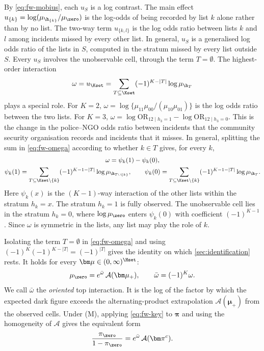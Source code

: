 By \eqref{eq:fw-mobius}, each $u_S$ is a log contrast. The main effect $u_{\{k\}}=\log(\mu_{\h_{\{k\}}}/\mu_{\zero})$ is the log-odds of being recorded by list $k$ alone rather than by no list. The two-way term $u_{\{k,l\}}$ is the log odds ratio between lists $k$ and $l$ among incidents missed by every other list. In general, $u_S$ is a generalised log odds ratio of the lists in $S$, computed in the stratum missed by every list outside $S$. Every $u_S$ involves the unobservable cell, through the term $T=\emptyset$. The highest-order interaction
\begin{equation}\label{eq:fw-omega}
  \omega=u_{\Kset}=\sum_{T\subseteq\Kset}(-1)^{K-|T|}\log\mu_{\h_T}
\end{equation}
plays a special role. For $K=2$, $\omega=\log\{\mu_{11}\mu_{00}/(\mu_{10}\mu_{01})\}$ is the log odds ratio between the two lists. For $K=3$, $\omega=\log\mathrm{OR}_{12\mid h_3=1}-\log\mathrm{OR}_{12\mid h_3=0}$. This is the change in the police--NGO odds ratio between incidents that the community security organisation records and incidents that it misses. In general, splitting the sum in \eqref{eq:fw-omega} according to whether $k\in T$ gives, for every $k$,
\begin{gather}
  \omega=\psi_k(1)-\psi_k(0),\label{eq:fw-slice}\\
  \psi_k(1)=\sum_{T\subseteq\Kset\setminus\{k\}}(-1)^{K-1-|T|}\log\mu_{\h_{T\cup\{k\}}},\qquad
  \psi_k(0)=\sum_{T\subseteq\Kset\setminus\{k\}}(-1)^{K-1-|T|}\log\mu_{\h_{T}} .\notag
\end{gather}
Here $\psi_k(x)$ is the $(K-1)$-way interaction of the other lists within the stratum $h_k=x$. The stratum $h_k=1$ is fully observed. The unobservable cell lies in the stratum $h_k=0$, where $\log\mu_{\zero}$ enters $\psi_k(0)$ with coefficient $(-1)^{K-1}$. Since $\omega$ is symmetric in the lists, any list may play the role of $k$.

Isolating the term $T=\emptyset$ in \eqref{eq:fw-omega} and using $(-1)^{K}(-1)^{K-|T|}=(-1)^{|T|}$ gives the identity on which \cref{sec:identification} rests. It holds for every $\bm\mu\in(0,\infty)^{\Hset}$:
\begin{equation}\label{eq:fw-key}
  \mu_{\zero}=e^{\bar\omega}\,\mathcal A(\bm\mu_+),
  \qquad \bar\omega=(-1)^K\omega .
\end{equation}
We call $\bar\omega$ the \emph{oriented} top interaction. It is the log of the factor by which the expected dark figure exceeds the alternating-product extrapolation $\mathcal A(\bm\mu_+)$ from the observed cells. Under (M), applying \eqref{eq:fw-key} to $\bm\pi$ and using the homogeneity of $\mathcal A$ gives the equivalent form
\begin{equation}\label{eq:fw-keyM}
  \frac{\pi_{\zero}}{1-\pi_{\zero}}=e^{\bar\omega}\,\mathcal A(\bm\pi^c).
\end{equation}


